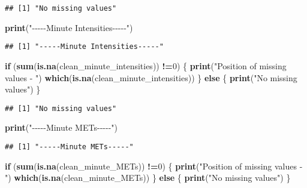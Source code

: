 \documentclass[
]{article}
\newenvironment{Shaded}{\begin{snugshade}}{\end{snugshade}}
\newcommand{\ControlFlowTok}[1]{\textcolor[rgb]{0.13,0.29,0.53}{\textbf{#1}}}
\newcommand{\DecValTok}[1]{\textcolor[rgb]{0.00,0.00,0.81}{#1}}
\newcommand{\FunctionTok}[1]{\textcolor[rgb]{0.13,0.29,0.53}{\textbf{#1}}}
\newcommand{\NormalTok}[1]{#1}
\newcommand{\SpecialCharTok}[1]{\textcolor[rgb]{0.81,0.36,0.00}{\textbf{#1}}}
\newcommand{\StringTok}[1]{\textcolor[rgb]{0.31,0.60,0.02}{#1}}
\begin{document}
\begin{verbatim}
## [1] "No missing values"
\end{verbatim}

\begin{Shaded}
\begin{Highlighting}[]
\FunctionTok{print}\NormalTok{(}\StringTok{"{-}{-}{-}{-}{-}Minute Intensities{-}{-}{-}{-}{-}"}\NormalTok{)}
\end{Highlighting}
\end{Shaded}

\begin{verbatim}
## [1] "-----Minute Intensities-----"
\end{verbatim}

\begin{Shaded}
\begin{Highlighting}[]
\ControlFlowTok{if}\NormalTok{ (}\FunctionTok{sum}\NormalTok{(}\FunctionTok{is.na}\NormalTok{(clean\_minute\_intensities)) }\SpecialCharTok{!=}\DecValTok{0}\NormalTok{) \{}
  \FunctionTok{print}\NormalTok{(}\StringTok{"Position of missing values {-} "}\NormalTok{)}
  \FunctionTok{which}\NormalTok{(}\FunctionTok{is.na}\NormalTok{(clean\_minute\_intensities))}
\NormalTok{\} }\ControlFlowTok{else}\NormalTok{ \{}
  \FunctionTok{print}\NormalTok{(}\StringTok{"No missing values"}\NormalTok{)}
\NormalTok{\}}
\end{Highlighting}
\end{Shaded}

\begin{verbatim}
## [1] "No missing values"
\end{verbatim}

\begin{Shaded}
\begin{Highlighting}[]
\FunctionTok{print}\NormalTok{(}\StringTok{"{-}{-}{-}{-}{-}Minute METs{-}{-}{-}{-}{-}"}\NormalTok{)}
\end{Highlighting}
\end{Shaded}

\begin{verbatim}
## [1] "-----Minute METs-----"
\end{verbatim}

\begin{Shaded}
\begin{Highlighting}[]
\ControlFlowTok{if}\NormalTok{ (}\FunctionTok{sum}\NormalTok{(}\FunctionTok{is.na}\NormalTok{(clean\_minute\_METs)) }\SpecialCharTok{!=}\DecValTok{0}\NormalTok{) \{}
  \FunctionTok{print}\NormalTok{(}\StringTok{"Position of missing values {-} "}\NormalTok{)}
  \FunctionTok{which}\NormalTok{(}\FunctionTok{is.na}\NormalTok{(clean\_minute\_METs))}
\NormalTok{\} }\ControlFlowTok{else}\NormalTok{ \{}
  \FunctionTok{print}\NormalTok{(}\StringTok{"No missing values"}\NormalTok{)}
\NormalTok{\}}
\end{Highlighting}
\end{Shaded}
\end{document}
